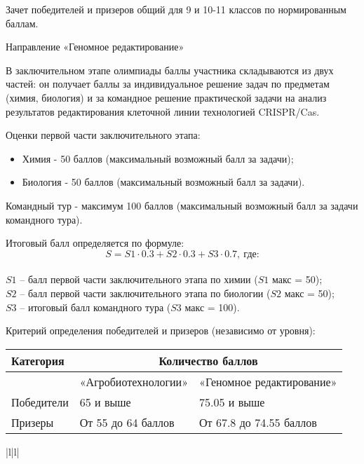 Зачет победителей и призеров общий для 9 и 10-11 классов по нормированным баллам.

Направление «Геномное редактирование» 

В заключительном этапе олимпиады баллы участника складываются из двух частей: он получает баллы за индивидуальное решение задач по предметам (химия, биология) и за командное решение практической задачи на анализ результатов редактирования клеточной линии технологией CRISPR/Cas.

Оценки первой части заключительного этапа:
\begin{itemize}
    \item Химия  - 50 баллов (максимальный возможный балл за задачи);
    \item Биология  - 50 баллов (максимальный возможный балл за задачи).
\end{itemize}

Командный тур - максимум 100 баллов (максимальный возможный балл за задачи командного тура).

Итоговый балл определяется по формуле: $$S = S1 \cdot 0.3 + S2 \cdot 0.3 + S3 \cdot 0.7, \: \text{где:}$$ \\
$S1$ – балл первой части заключительного этапа по химии ($S1$ макс = 50);\\
$S2$ – балл первой части заключительного этапа по биологии ($S2$ макс = 50);\\
$S3$ – итоговый балл командного тура ($S3$ макс = 100).

Критерий определения победителей и призеров (независимо от уровня):
\begin{center}
    \begin{tabular}{|l|l|l|}
        \hline
        Категория& \multicolumn{2}{|c|}{Количество баллов} \\
        \hline
        &«Агробиотехнологии»&«Геномное редактирование»\\
        \hline
        Победители&65 и выше&75.05 и выше\\
        \hline
        Призеры&От 55 до 64 баллов&От 67.8 до 74.55 баллов\\
        \hline
    \end{tabular}{|l|l|}
\end{center}